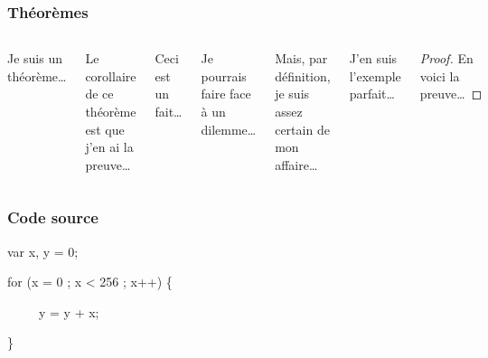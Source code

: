 \documentclass[aspectratio=1610,compress,t,english,french]{hecppt}
\begin{document}
\begin{frame}
	\frametitle{Théorèmes}
	
	\begin{columns}
		\vspace{-7mm}
		\begin{theorem}
			Je suis un théorème\ldots
		\end{theorem}
	
		\begin{corollary}
			Le corollaire de ce théorème est que j'en ai la preuve\dots
		\end{corollary}
	
		\begin{fact}
			Ceci est un fait\ldots
		\end{fact}
	
		\begin{lemma}
			Je pourrais faire face à un dilemme\ldots
		\end{lemma}
	
		\vspace{-7mm}
		\begin{definition}
			Mais, par définition, je suis assez certain de mon affaire\dots
		\end{definition}
	
		\begin{example}
			J'en suis l'exemple parfait\dots
		\end{example}
	
		\begin{proof}
			En voici la preuve\dots
		\end{proof}
	\end{columns}
\end{frame}

\begin{frame}
	\frametitle{Code source}
	
	\begin{semiverbatim}
		var x, y = 0;
		
		for (x = 0 ; x < 256 ; x++) \{
			
		\ \ \ \ \ y = y + x;
				
		\}
	\end{semiverbatim}
\end{frame}
\end{document}
